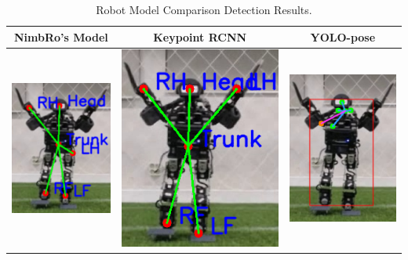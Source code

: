 \newpage
\def\arraystretch{0.5}
\begin{longtable}{|c|c|c|}
  \caption{Robot Model Comparison Detection Results.}
  \label{tb:robotmodelcomparisondetectionresults}\\
  \hline
  \rowcolor[HTML]{C0C0C0}
  \textbf{NimbRo's Model}    & \textbf{Keypoint RCNN} & \textbf{YOLO-pose}\\
  \hline
  \includegraphics[scale=0.85]{gambar/nimbro-1.png} & \includegraphics[scale=0.48]{gambar/rcnn-1.png} & \includegraphics[scale=0.66]{gambar/yolo-1.png} \\

\end{longtable}
